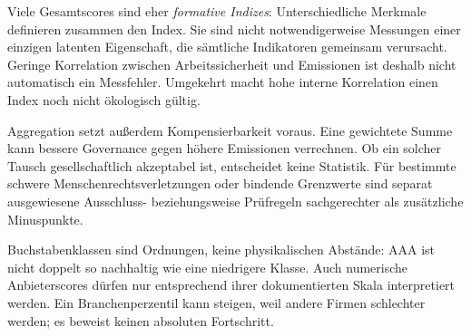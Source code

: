\documentclass[11pt,a4paper]{article}
\begin{document}
Viele Gesamtscores sind eher \emph{formative Indizes}: Unterschiedliche Merkmale definieren zusammen den Index. Sie sind nicht notwendigerweise Messungen einer einzigen latenten Eigenschaft, die sämtliche Indikatoren gemeinsam verursacht. Geringe Korrelation zwischen Arbeitssicherheit und Emissionen ist deshalb nicht automatisch ein Messfehler. Umgekehrt macht hohe interne Korrelation einen Index noch nicht ökologisch gültig.

Aggregation setzt außerdem Kompensierbarkeit voraus. Eine gewichtete Summe kann bessere Governance gegen höhere Emissionen verrechnen. Ob ein solcher Tausch gesellschaftlich akzeptabel ist, entscheidet keine Statistik. Für bestimmte schwere Menschenrechtsverletzungen oder bindende Grenzwerte sind separat ausgewiesene Ausschluss- beziehungsweise Prüfregeln sachgerechter als zusätzliche Minuspunkte.

Buchstabenklassen sind Ordnungen, keine physikalischen Abstände: AAA ist nicht \glqq doppelt so nachhaltig\grqq{} wie eine niedrigere Klasse. Auch numerische Anbieterscores dürfen nur entsprechend ihrer dokumentierten Skala interpretiert werden. Ein Branchenperzentil kann steigen, weil andere Firmen schlechter werden; es beweist keinen absoluten Fortschritt.
\end{document}
